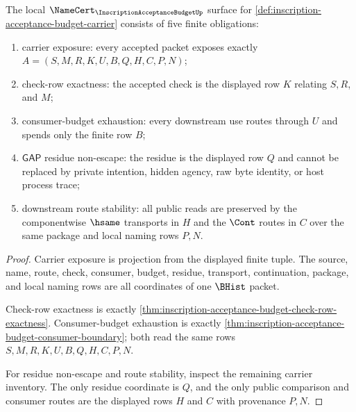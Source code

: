 \begin{theorem}
\label{thm:inscription-acceptance-budget-namecert-obligations}
The local $\NameCert_{\InscriptionAcceptanceBudgetUp}$ surface for \autoref{def:inscription-acceptance-budget-carrier} consists of five finite obligations:
\begin{enumerate}
\item carrier exposure: every accepted packet exposes exactly $A=(S,M,R,K,U,B,Q,H,C,P,N)$;
\item check-row exactness: the accepted check is the displayed row $K$ relating $S,R$, and $M$;
\item consumer-budget exhaustion: every downstream use routes through $U$ and spends only the finite row $B$;
\item $\mathsf{GAP}$ residue non-escape: the residue is the displayed row $Q$ and cannot be replaced by private intention, hidden agency, raw byte identity, or host process trace;
\item downstream route stability: all public reads are preserved by the componentwise $\hsame$ transports in $H$ and the $\Cont$ routes in $C$ over the same package and local naming rows $P,N$.
\end{enumerate}
\end{theorem}
\begin{proof}
Carrier exposure is projection from the displayed finite tuple. The source, name, route, check, consumer, budget, residue, transport, continuation, package, and local naming rows are all coordinates of one $\BHist$ packet.

Check-row exactness is exactly \autoref{thm:inscription-acceptance-budget-check-row-exactness}. Consumer-budget exhaustion is exactly \autoref{thm:inscription-acceptance-budget-consumer-boundary}; both read the same rows $S,M,R,K,U,B,Q,H,C,P,N$.

For residue non-escape and route stability, inspect the remaining carrier inventory. The only residue coordinate is $Q$, and the only public comparison and consumer routes are the displayed rows $H$ and $C$ with provenance $P,N$.
\end{proof}

